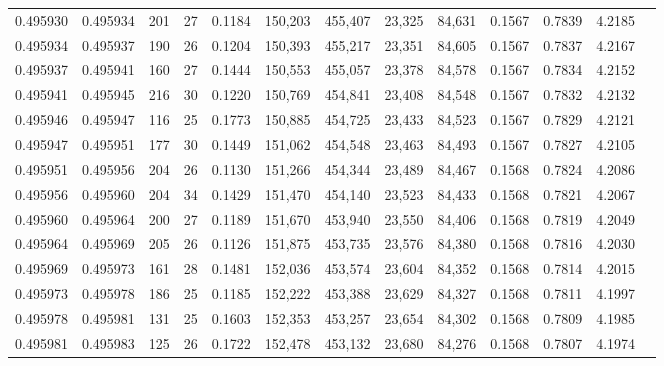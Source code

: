 \begin{tabular}{rrrrrrrrrrrrr}
0.495930 & 0.495934 & 201 &  27 &                                     0.1184 & 150,203 & 455,407 &  23,325 &  84,631 & 0.1567 & 0.7839 & 4.2185 \\
0.495934 & 0.495937 & 190 &  26 &                                     0.1204 & 150,393 & 455,217 &  23,351 &  84,605 & 0.1567 & 0.7837 & 4.2167 \\
0.495937 & 0.495941 & 160 &  27 &                                     0.1444 & 150,553 & 455,057 &  23,378 &  84,578 & 0.1567 & 0.7834 & 4.2152 \\
0.495941 & 0.495945 & 216 &  30 &                                     0.1220 & 150,769 & 454,841 &  23,408 &  84,548 & 0.1567 & 0.7832 & 4.2132 \\
0.495946 & 0.495947 & 116 &  25 &                                     0.1773 & 150,885 & 454,725 &  23,433 &  84,523 & 0.1567 & 0.7829 & 4.2121 \\
0.495947 & 0.495951 & 177 &  30 &                                     0.1449 & 151,062 & 454,548 &  23,463 &  84,493 & 0.1567 & 0.7827 & 4.2105 \\
0.495951 & 0.495956 & 204 &  26 &                                     0.1130 & 151,266 & 454,344 &  23,489 &  84,467 & 0.1568 & 0.7824 & 4.2086 \\
0.495956 & 0.495960 & 204 &  34 &                                     0.1429 & 151,470 & 454,140 &  23,523 &  84,433 & 0.1568 & 0.7821 & 4.2067 \\
0.495960 & 0.495964 & 200 &  27 &                                     0.1189 & 151,670 & 453,940 &  23,550 &  84,406 & 0.1568 & 0.7819 & 4.2049 \\
0.495964 & 0.495969 & 205 &  26 &                                     0.1126 & 151,875 & 453,735 &  23,576 &  84,380 & 0.1568 & 0.7816 & 4.2030 \\
0.495969 & 0.495973 & 161 &  28 &                                     0.1481 & 152,036 & 453,574 &  23,604 &  84,352 & 0.1568 & 0.7814 & 4.2015 \\
0.495973 & 0.495978 & 186 &  25 &                                     0.1185 & 152,222 & 453,388 &  23,629 &  84,327 & 0.1568 & 0.7811 & 4.1997 \\
0.495978 & 0.495981 & 131 &  25 &                                     0.1603 & 152,353 & 453,257 &  23,654 &  84,302 & 0.1568 & 0.7809 & 4.1985 \\
0.495981 & 0.495983 & 125 &  26 &                                     0.1722 & 152,478 & 453,132 &  23,680 &  84,276 & 0.1568 & 0.7807 & 4.1974 \\

\end{tabular}
